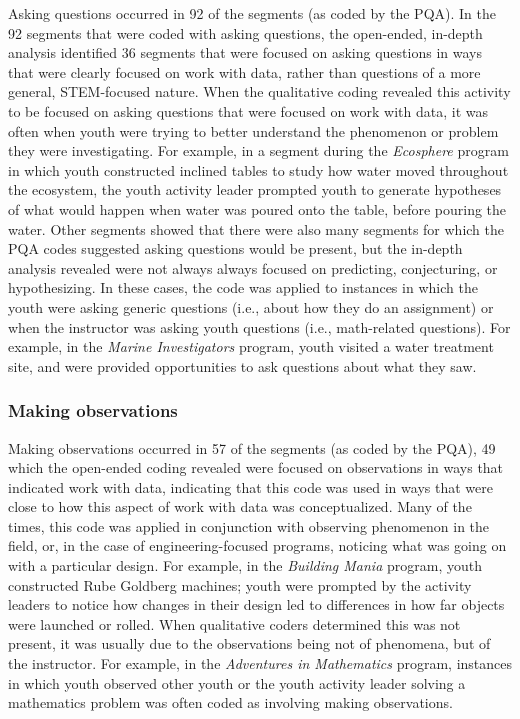 \documentclass[]{msu-thesis}
\theoremstyle{definition}
\theoremstyle{definition}
\theoremstyle{definition}
\theoremstyle{remark}
\begin{document}
Asking questions occurred in 92 of the segments (as coded by the PQA).
In the 92 segments that were coded with asking questions, the
open-ended, in-depth analysis identified 36 segments that were focused
on asking questions in ways that were clearly focused on work with data,
rather than questions of a more general, STEM-focused nature. When the
qualitative coding revealed this activity to be focused on asking
questions that were focused on work with data, it was often when youth
were trying to better understand the phenomenon or problem they were
investigating. For example, in a segment during the \emph{Ecosphere}
program in which youth constructed inclined tables to study how water
moved throughout the ecosystem, the youth activity leader prompted youth
to generate hypotheses of what would happen when water was poured onto
the table, before pouring the water. Other segments showed that there
were also many segments for which the PQA codes suggested asking
questions would be present, but the in-depth analysis revealed were not
always always focused on predicting, conjecturing, or hypothesizing. In
these cases, the code was applied to instances in which the youth were
asking generic questions (i.e., about how they do an assignment) or when
the instructor was asking youth questions (i.e., math-related
questions). For example, in the \emph{Marine Investigators} program,
youth visited a water treatment site, and were provided opportunities to
ask questions about what they saw.

\subsubsection{Making observations}\label{making-observations}

Making observations occurred in 57 of the segments (as coded by the
PQA), 49 which the open-ended coding revealed were focused on
observations in ways that indicated work with data, indicating that this
code was used in ways that were close to how this aspect of work with
data was conceptualized. Many of the times, this code was applied in
conjunction with observing phenomenon in the field, or, in the case of
engineering-focused programs, noticing what was going on with a
particular design. For example, in the \emph{Building Mania} program,
youth constructed Rube Goldberg machines; youth were prompted by the
activity leaders to notice how changes in their design led to
differences in how far objects were launched or rolled. When qualitative
coders determined this was not present, it was usually due to the
observations being not of phenomena, but of the instructor. For example,
in the \emph{Adventures in Mathematics} program, instances in which
youth observed other youth or the youth activity leader solving a
mathematics problem was often coded as involving making observations.
\end{document}

